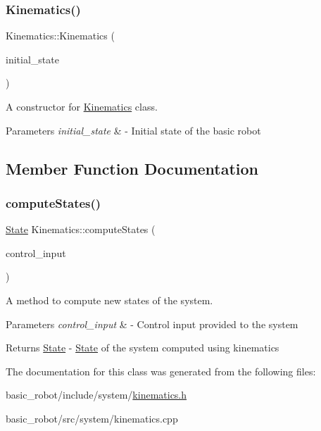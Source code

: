 \subsubsection{\texorpdfstring{Kinematics()}{Kinematics()}}
{\footnotesize\ttfamily Kinematics\+::\+Kinematics (\begin{DoxyParamCaption}\item[{const \hyperlink{structState}{State} \&}]{initial\+\_\+state }\end{DoxyParamCaption})}



A constructor for \hyperlink{classKinematics}{Kinematics} class. 


\begin{DoxyParams}{Parameters}
{\em initial\+\_\+state} & -\/ Initial state of the basic robot \\
\hline
\end{DoxyParams}


\subsection{Member Function Documentation}
\mbox{\label{classKinematics_abc359954c01ed158fe090e01b5539f06}} 
\subsubsection{\texorpdfstring{compute\+States()}{computeStates()}}
{\footnotesize\ttfamily \hyperlink{structState}{State} Kinematics\+::compute\+States (\begin{DoxyParamCaption}\item[{ackermann\+\_\+msgs\+::\+Ackermann\+Drive\+Stamped \&}]{control\+\_\+input }\end{DoxyParamCaption})}



A method to compute new states of the system. 


\begin{DoxyParams}{Parameters}
{\em control\+\_\+input} & -\/ Control input provided to the system \\
\hline
\end{DoxyParams}
\begin{DoxyReturn}{Returns}
\hyperlink{structState}{State} -\/ \hyperlink{structState}{State} of the system computed using kinematics 
\end{DoxyReturn}


The documentation for this class was generated from the following files\+:\begin{DoxyCompactItemize}
\item 
basic\+\_\+robot/include/system/\hyperlink{kinematics_8h}{kinematics.\+h}\item 
basic\+\_\+robot/src/system/kinematics.\+cpp\end{DoxyCompactItemize}
